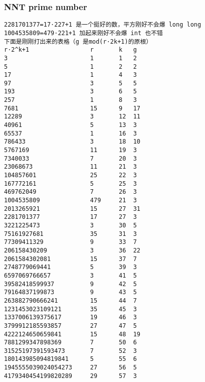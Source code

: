 \subsubsection{NNT prime number}
\begin{verbatim}
2281701377=17⋅227+1 是一个挺好的数，平方刚好不会爆 long long
1004535809=479⋅221+1 加起来刚好不会爆 int 也不错
下面是刚刚打出来的表格（g 是mod(r⋅2k+1)的原根）
r⋅2^k+1					r 		k 	g
3 						1 		1 	2
5 						1 		2 	2
17 						1 		4 	3
97 						3 		5 	5
193 					3 		6 	5
257 					1 		8 	3
7681 					15 		9 	17
12289 					3 		12 	11
40961 					5 		13 	3
65537 					1 		16 	3
786433 					3 		18 	10
5767169 				11 		19 	3
7340033 				7 		20 	3
23068673 				11 		21 	3
104857601 				25 		22 	3
167772161 				5 		25 	3
469762049 				7 		26 	3
1004535809 				479 	21 	3
2013265921 				15 		27 	31
2281701377 				17 		27 	3
3221225473 				3 		30 	5
75161927681 			35 		31 	3
77309411329 			9 		33 	7
206158430209 			3 		36 	22
2061584302081 			15 		37 	7
2748779069441 			5 		39 	3
6597069766657 			3 		41 	5
39582418599937 			9 		42 	5
79164837199873 			9 		43 	5
263882790666241 		15 		44 	7
1231453023109121 		35 		45 	3
1337006139375617 		19 		46 	3
3799912185593857 		27 		47 	5
4222124650659841 		15 		48 	19
7881299347898369 		7 		50 	6
31525197391593473 		7 		52 	3
180143985094819841 		5 		55 	6
1945555039024054273 	27 		56 	5
4179340454199820289 	29 		57 	3
\end{verbatim}
